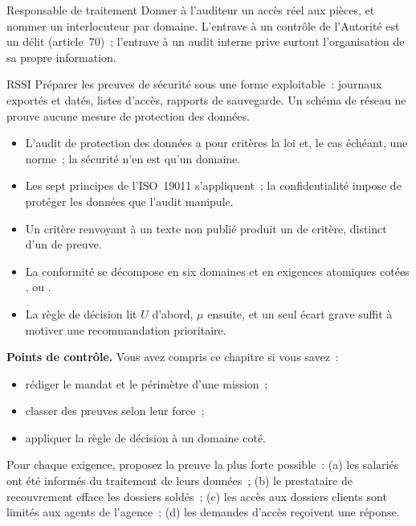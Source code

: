 \begin{boxmetier}{Responsable de traitement}
Donner à l'auditeur un accès réel aux pièces, et nommer un interlocuteur
par domaine. L'entrave à un contrôle de l'Autorité est un délit
(article~70)~; l'entrave à un audit interne prive surtout l'organisation
de sa propre information.
\end{boxmetier}

\begin{boxmetier}{RSSI}
Préparer les preuves de sécurité sous une forme exploitable~: journaux
exportés et datés, listes d'accès, rapports de sauvegarde. Un schéma de
réseau ne prouve aucune mesure de protection des données.
\end{boxmetier}

\begin{boxresume}
\begin{itemize}
    \item L'audit de protection des données a pour critères la loi et, le
          cas échéant, une norme~; la sécurité n'en est qu'un domaine.
    \item Les sept principes de l'ISO~19011 s'appliquent~; la
          confidentialité impose de protéger les données que l'audit
          manipule.
    \item Un critère renvoyant à un texte non publié produit un \NEK{} de
          critère, distinct d'un \NEK{} de preuve.
    \item La conformité se décompose en six domaines et en exigences
          atomiques cotées \OUI{}, \NON{} ou \NEK{}.
    \item La règle de décision lit $U$ d'abord, $\mu$ ensuite, et un seul
          écart grave suffit à motiver une recommandation prioritaire.
\end{itemize}
\end{boxresume}

\begin{boxinfo}
\textbf{Points de contrôle.} Vous avez compris ce chapitre si vous savez~:
\begin{itemize}
    \item rédiger le mandat et le périmètre d'une mission~;
    \item classer des preuves selon leur force~;
    \item appliquer la règle de décision à un domaine coté.
\end{itemize}
\end{boxinfo}

\begin{boxexo}[title={\ding{45}\quad Exercice~8.1. Quelle preuve \niveaubase}]
Pour chaque exigence, proposez la preuve la plus forte possible~: (a) les
salariés ont été informés du traitement de leurs données~; (b) le
prestataire de recouvrement efface les dossiers soldés~; (c) les accès aux
dossiers clients sont limités aux agents de l'agence~; (d) les demandes
d'accès reçoivent une réponse.
\end{boxexo}

